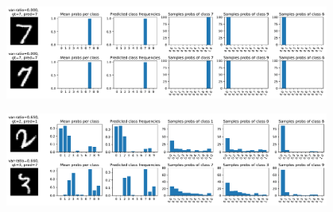 \begin{figure}[hp]
    \centering
    \includegraphics[width=0.95\textwidth]{var-ratio_certain_images.pdf}
    \caption{}
    \label{fig:varratio_certain}
\end{figure}
\begin{figure}[hp]
    \centering
    \includegraphics[width=0.95\textwidth]{var-ratio_uncertain_images.pdf}
    \caption{}
    \label{fig:varratio_uncertain}
\end{figure}
